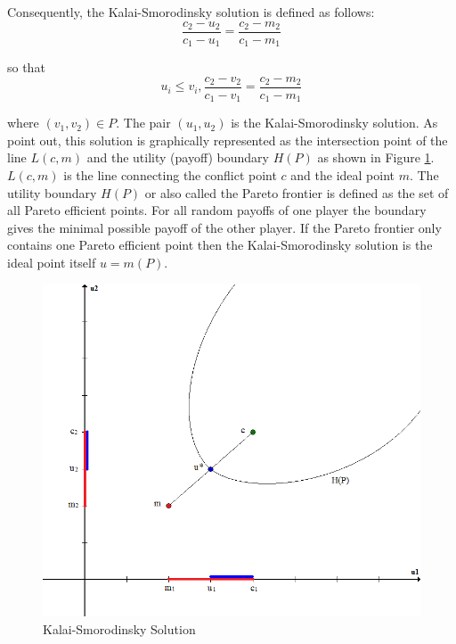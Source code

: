 Consequently, the Kalai-Smorodinsky solution is defined as follows:
\begin{equation}
\frac{c_2 - u_2}{c_1 - u_1} = \frac{c_2 - m_2}{c_1 - m_1}
\end{equation}

so that
\begin{equation}
u_i \leq v_i, \frac{c_2 - v_2}{c_1 - v_1} = \frac{c_2 - m_2}{c_1 - m_1} 
\end{equation}

where $(v_1,v_2) \in P$. The pair $(u_1,u_2)$ is the Kalai-Smorodinsky solution. As \citet{kalai1975other} point out, this solution is graphically represented as the intersection point of the line $L(c,m)$ and the utility (payoff) boundary $H(P)$ as shown in Figure \ref{fig:ksSol}. $L(c,m)$ is the line connecting the conflict point $c$ and the ideal point $m$. The utility boundary $H(P)$ or also called the Pareto frontier is defined as the set of all Pareto efficient points. For all random payoffs of one player the boundary gives the minimal possible payoff of the other player. If the Pareto frontier only contains one Pareto efficient point then the Kalai-Smorodinsky solution is the ideal point itself $u = m(P)$.

\begin{figure}[h]
\centering
\includegraphics[scale=0.5]{figures/kalaiSmorodinskySolution}
\caption{Kalai-Smorodinsky Solution}
\label{fig:ksSol}
\end{figure}

